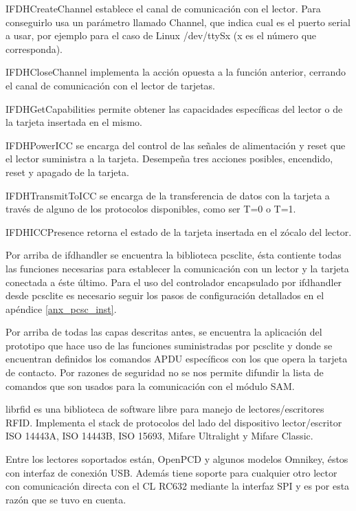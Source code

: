 \bigskip
IFDHCreateChannel establece el canal de comunicación con el lector. Para conseguirlo usa un parámetro llamado Channel, que indica cual es el puerto serial a usar, por ejemplo para el caso de Linux /dev/ttySx (x es el número que corresponda).

IFDHCloseChannel implementa la acción opuesta a la función anterior, cerrando el canal de comunicación con el lector de tarjetas.

IFDHGetCapabilities permite obtener las capacidades específicas del lector o de la tarjeta insertada en el mismo.

IFDHPowerICC se encarga del control de las señales de alimentación y reset que el lector suministra a la tarjeta. Desempeña tres acciones posibles, encendido, reset y apagado de la tarjeta.

IFDHTransmitToICC se encarga de la transferencia de datos con la tarjeta a través de alguno de los protocolos disponibles, como ser T=0 o T=1.

IFDHICCPresence retorna el estado de la tarjeta insertada en el zócalo del lector.

\bigskip
{}
Por arriba de ifdhandler se encuentra la biblioteca pcsclite, ésta contiente todas las funciones necesarias para establecer la comunicación con un lector y la tarjeta conectada a éste último. Para el uso del controlador encapsulado por ifdhandler desde pcsclite es necesario seguir los pasos de configuración detallados en el apéndice \ref{anx_pcsc_inst}.

\bigskip
{}
Por arriba de todas las capas descritas antes, se encuentra la aplicación del prototipo que hace uso de las funciones suministradas por pcsclite y donde se encuentran definidos los comandos APDU específicos con los que opera la tarjeta de contacto. Por razones de seguridad no se nos permite difundir la lista de comandos que son usados para la comunicación con el módulo SAM.


\newpage
{}
librfid es una biblioteca de software libre para manejo de lectores/escritores RFID. Implementa el stack de protocolos del lado del dispositivo lector/escritor ISO 14443A, ISO 14443B, ISO 15693, Mifare Ultralight y Mifare Classic.

Entre los lectores soportados están, OpenPCD y algunos modelos Omnikey, éstos con interfaz de conexión USB. Además tiene soporte para cualquier otro lector con comunicación directa con el CL RC632 mediante la interfaz SPI y es por esta razón que se tuvo en cuenta.

